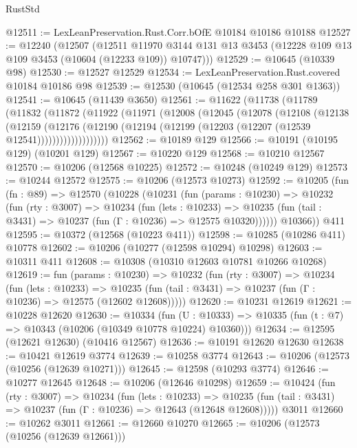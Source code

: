 \begin{lexlean}{RustStd}
\begin{coremodule}
@12511 := LexLeanPreservation.Rust.Corr.bOfE @10184 @10186 @10188
@12527 := @12240
    (@12507
      (@12511
        @11970
        @3144
        @131
        @13
        @3453
        (@12228 @109 @13 @109 @3453 (@10604 (@12233 @109)) @10747)))
@12529 := @10645 (@10339 @98)
@12530 := @12527 @12529
@12534 := LexLeanPreservation.Rust.covered @10184 @10186 @98
@12539 := @12530 (@10645 (@12534 @258 @301 @1363))
@12541 := @10645 (@11439 @3650)
@12561 := @11622
    (@11738
      (@11789
        (@11832
          (@11872
            (@11922
              (@11971
                (@12008
                  (@12045
                    (@12078
                      (@12108
                        (@12138
                          (@12159
                            (@12176
                              (@12190
                                (@12194 (@12199 (@12203 (@12207 (@12539 @12541)))))))))))))))))))
@12562 := @10189 @129
@12566 := @10191 (@10195 @129) (@10201 @129)
@12567 := @10220 @129
@12568 := @10210 @12567
@12570 := @10206 (@12568 @10225)
@12572 := @10248 (@10249 @129)
@12573 := @10244 @12572
@12575 := @10206 (@12573 @10273)
@12592 := @10205
    (fun (fn : @89) =>
    @12570
      (@10228
        (@10231
          (fun (params : @10230) =>
          @10232
            (fun (rty : @3007) =>
            @10234
              (fun (lets : @10233) =>
              @10235 (fun (tail : @3431) => @10237 (fun (Γ : @10236) => @12575 @10320))))))
        @10366))
    @411
@12595 := @10372 (@12568 (@10223 @411))
@12598 := @10285 (@10286 @411) @10778
@12602 := @10206 (@10277 (@12598 @10294) @10298)
@12603 := @10311 @411
@12608 := @10308 (@10310 @12603 @10781 @10266 @10268)
@12619 := fun (params : @10230) =>
  @10232
    (fun (rty : @3007) =>
    @10234
      (fun (lets : @10233) =>
      @10235 (fun (tail : @3431) => @10237 (fun (Γ : @10236) => @12575 (@12602 @12608)))))
@12620 := @10231 @12619
@12621 := @10228 @12620
@12630 := @10334
    (fun (U : @10333) => @10335 (fun (t : @7) => @10343 (@10206 (@10349 @10778 @10224) @10360)))
@12634 := @12595 (@12621 @12630) (@10416 @12567)
@12636 := @10191 @12620 @12630
@12638 := @10421 @12619 @3774
@12639 := @10258 @3774
@12643 := @10206 (@12573 (@10256 (@12639 @10271)))
@12645 := @12598 (@10293 @3774)
@12646 := @10277 @12645
@12648 := @10206 (@12646 @10298)
@12659 := @10424
    (fun (rty : @3007) =>
    @10234
      (fun (lets : @10233) =>
      @10235 (fun (tail : @3431) => @10237 (fun (Γ : @10236) => @12643 (@12648 @12608)))))
    @3011
@12660 := @10262 @3011
@12661 := @12660 @10270
@12665 := @10206 (@12573 (@10256 (@12639 @12661)))

\end{coremodule}
\end{lexlean}
